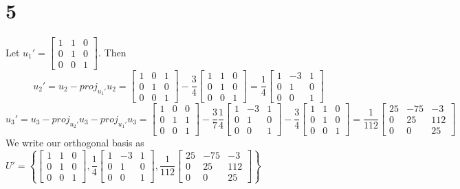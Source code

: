 \documentclass{article}
\begin{document}
\section*{5}
Let $u_1' = \begin{bmatrix}1&1&0\\0&1&0\\0&0&1\end{bmatrix}$. Then 
\[u_2' = u_2 - proj_{u_1'}u_2 = \begin{bmatrix}1&0&1\\0&1&0\\0&0&1\end{bmatrix} - \dfrac{3}{4}\begin{bmatrix}1&1&0\\0&1&0\\0&0&1\end{bmatrix} = \dfrac{1}{4}\begin{bmatrix}1&-3&1\\0&1&0\\0&0&1\end{bmatrix}\]
\[u_3' = u_3 - proj_{u_2'}u_3 - proj_{u_1'}u_3 = \begin{bmatrix}1&0&0\\0&1&1\\0&0&1\end{bmatrix} - \dfrac{3}{7}\dfrac{1}{4}\begin{bmatrix}1&-3&1\\0&1&0\\0&0&1\end{bmatrix} - \dfrac{3}{4}\begin{bmatrix}1&1&0\\0&1&0\\0&0&1\end{bmatrix} = \dfrac{1}{112}\begin{bmatrix}25&-75&-3\\0&25&112\\0&0&25\end{bmatrix}\]
We write our orthogonal basis as $U' = \left\{ \begin{bmatrix}1&1&0\\0&1&0\\0&0&1\end{bmatrix}, \dfrac{1}{4}\begin{bmatrix}1&-3&1\\0&1&0\\0&0&1\end{bmatrix}, \dfrac{1}{112}\begin{bmatrix}25&-75&-3\\0&25&112\\0&0&25\end{bmatrix} \right\}$
\end{document}
